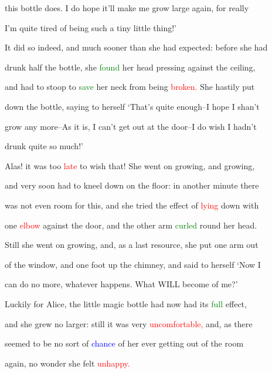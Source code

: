  this bottle does. I do \textcolor{BurntOrange}{hope} it’ll make me \textcolor{BurntOrange}{grow} large again, for really

 I’m quite tired of being such a tiny little thing!’



 It did so indeed, and much sooner than she had \textcolor{BurntOrange}{expected:} before she had

 drunk half the bottle, she \textcolor{green}{found} her head pressing against the ceiling,

 and had to stoop to \textcolor{green}{save} her neck from being \textcolor{red}{broken.} She hastily put

 down the bottle, saying to herself ‘That’s quite enough--I \textcolor{BurntOrange}{hope} I shan’t

 \textcolor{BurntOrange}{grow} any more--As it is, I can’t get out at the door--I do wish I hadn’t

 drunk quite so much!’



 Alas! it was too \textcolor{red}{late} to wish that! She went on \textcolor{BurntOrange}{growing,} and \textcolor{BurntOrange}{growing,}

 and very soon had to kneel down on the floor: in another minute there

 was not even room for this, and she tried the effect of \textcolor{red}{lying} down with

 one \textcolor{red}{elbow} against the door, and the other arm \textcolor{green}{curled} round her head.

 Still she went on \textcolor{BurntOrange}{growing,} and, as a last resource, she put one arm out

 of the window, and one foot up the chimney, and said to herself ‘Now I

 can do no more, whatever happens. What WILL become of me?’



 Luckily for Alice, the little magic bottle had now had its \textcolor{green}{full} effect,

 and she \textcolor{BurntOrange}{grew} no larger: still it was very \textcolor{red}{uncomfortable,} and, as there

 seemed to be no sort of \textcolor{blue}{chance} of her ever getting out of the room

 again, no wonder she felt \textcolor{red}{unhappy.}



